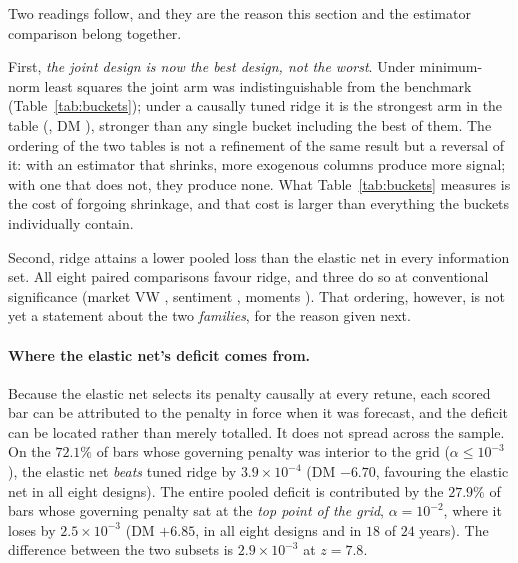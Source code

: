 Two readings follow, and they are the reason this section and the
estimator comparison belong together.

First, \emph{the joint design is now the best design, not the worst}.
Under minimum-norm least squares the joint arm was indistinguishable
from the benchmark (Table~\ref{tab:buckets}); under a causally tuned
ridge it is the strongest arm in the table
(\unifBrTunedAllFeaturesQLIKE{}, DM \unifBrTunedAllFeaturesDM{}),
stronger than any single bucket including the best of them. The ordering
of the two tables is not a refinement of the same result but a reversal
of it: with an estimator that shrinks, more exogenous columns produce
more signal; with one that does not, they produce none. What
Table~\ref{tab:buckets} measures is the cost of forgoing shrinkage, and
that cost is larger than everything the buckets individually contain.

Second, ridge attains a lower pooled loss than the elastic net in every
information set. All eight paired comparisons favour ridge, and three do
so at conventional significance (market VW
\unifIncrBeTunedMarketVwDM{}, sentiment \unifIncrBeTunedSentimentDM{},
moments \unifIncrBeTunedMomentsDM{}). That ordering, however, is not yet
a statement about the two \emph{families}, for the reason given next.

\paragraph{Where the elastic net's deficit comes from.}
Because the elastic net selects its penalty causally at every retune,
each scored bar can be attributed to the penalty in force when it was
forecast, and the deficit can be located rather than merely totalled.
It does not spread across the sample. On the $72.1\%$ of bars whose
governing penalty was interior to the grid ($\alpha \le 10^{-3}$), the
elastic net \emph{beats} tuned ridge by
$3.9 \times 10^{-4}$ (DM $-6.70$, favouring the elastic net in all eight
designs). The entire pooled deficit is contributed by the $27.9\%$ of
bars whose governing penalty sat at the \emph{top point of the grid},
$\alpha = 10^{-2}$, where it loses by $2.5 \times 10^{-3}$ (DM $+6.85$,
in all eight designs and in $18$ of $24$ years). The
difference between the two subsets is $2.9 \times 10^{-3}$ at
$z = 7.8$.

